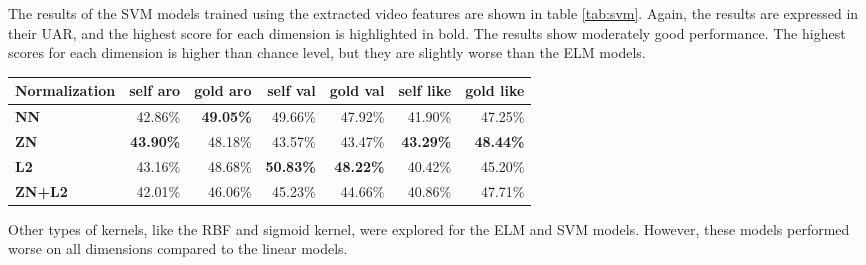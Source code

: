 The results of the SVM models trained using the extracted video features are shown in table \ref{tab:svm}. Again, the results are expressed in their UAR, and the highest score for each dimension is highlighted in bold. The results show moderately good performance. The highest scores for each dimension is higher than chance level, but they are slightly worse than the ELM models. 

\begin{table*}[h]
\begin{tabular}{|l|r|r|r|r|r|r|}
\hline
\rowcolor[HTML]{C0C0C0} 
\textbf{Normalization} & \multicolumn{1}{P{1.5cm}|}{\cellcolor[HTML]{C0C0C0}\textbf{self aro}} & \multicolumn{1}{P{1.5cm}|}{\cellcolor[HTML]{C0C0C0}\textbf{gold aro}} & \multicolumn{1}{P{1.5cm}|}{\cellcolor[HTML]{C0C0C0}\textbf{self val}} & \multicolumn{1}{P{1.5cm}|}{\cellcolor[HTML]{C0C0C0}\textbf{gold val}} & \multicolumn{1}{P{1.5cm}|}{\cellcolor[HTML]{C0C0C0}\textbf{self like}} & \multicolumn{1}{P{1.5cm}|}{\cellcolor[HTML]{C0C0C0}\textbf{gold like}} \\ \hline
\textbf{NN} & \cellcolor[HTML]{FFE1E1}42.86\% & \cellcolor[HTML]{FF0000}\textbf{49.05\%} & \cellcolor[HTML]{FFDD7F}49.66\% & \cellcolor[HTML]{FFE7A3}47.92\% & \cellcolor[HTML]{E1F3EA}41.90\% & \cellcolor[HTML]{70C69C}47.25\%  \\ \hline
\textbf{ZN} & \cellcolor[HTML]{FFBBBB}\textbf{43.90\%} & \cellcolor[HTML]{FF2020}48.18\% & \cellcolor[HTML]{FFFFFD}43.57\% & \cellcolor[HTML]{FFFFFF}43.47\% & \cellcolor[HTML]{C3E7D6}\textbf{43.29\%} & \cellcolor[HTML]{57BB8A}\textbf{48.44\%}  \\ \hline
\textbf{L2} & \cellcolor[HTML]{FFD6D6}43.16\% & \cellcolor[HTML]{FF0E0E}48.68\% & \cellcolor[HTML]{FFD666}\textbf{50.83\%} & \cellcolor[HTML]{FFE59D}\textbf{48.22\%} & \cellcolor[HTML]{FFFFFF}40.42\% & \cellcolor[HTML]{9BD7BA}45.20\% \\ \hline
\textbf{ZN+L2} & \cellcolor[HTML]{FFFFFF}42.01\% & \cellcolor[HTML]{FF6D6D}46.06\% & \cellcolor[HTML]{FFF6DB}45.23\% & \cellcolor[HTML]{FFF9E7}44.66\% & \cellcolor[HTML]{F6FCF9}40.86\% & \cellcolor[HTML]{67C295}47.71\%  \\ \hline
\end{tabular}
\caption{Support Vector Machine model performance results expressed in UAR. "aro": arousal, "val": valence, "like": likeability.}
\label{tab:svm}
\end{table*}

Other types of kernels, like the RBF and sigmoid kernel, were explored for the ELM and SVM models. However, these models performed worse on all dimensions compared to the linear models. 

